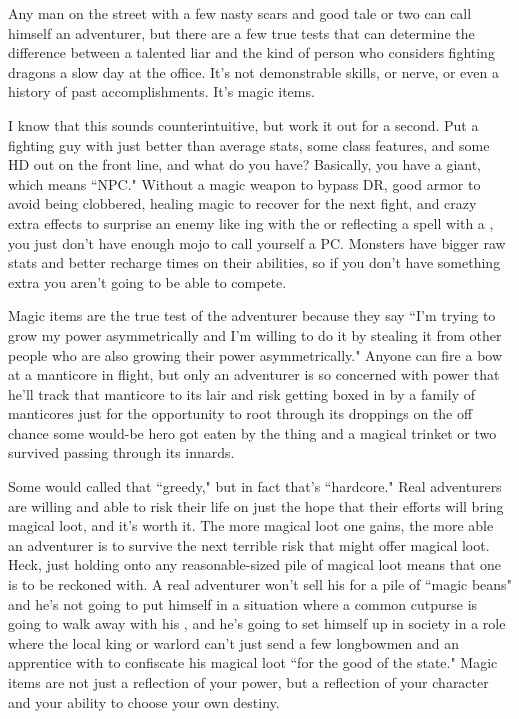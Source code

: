 Any man on the street with a few nasty scars and good tale or two can call himself an adventurer, but there are a few true tests that can determine the difference between a talented liar and the kind of person who considers fighting dragons a slow day at the office. It's not demonstrable skills, or nerve, or even a history of past accomplishments. It's magic items.

I know that this sounds counterintuitive, but work it out for a second. Put a fighting guy with just better than average stats, some class features, and some HD out on the front line, and what do you have? Basically, you have a giant, which means ``NPC." Without a magic weapon to bypass DR, good armor to avoid being clobbered, healing magic to recover for the next fight, and crazy extra effects to surprise an enemy like ing with the  or reflecting a spell with a , you just don't have enough mojo to call yourself a PC. Monsters have bigger raw stats and better recharge times on their abilities, so if you don't have something extra you aren't going to be able to compete.

Magic items are the true test of the adventurer because they say ``I'm trying to grow my power asymmetrically and I'm willing to do it by stealing it from other people who are also growing their power asymmetrically." Anyone can fire a bow at a manticore in flight, but only an adventurer is so concerned with power that he'll track that manticore to its lair and risk getting boxed in by a family of manticores just for the opportunity to root through its droppings on the off chance some would-be hero got eaten by the thing and a magical trinket or two survived passing through its innards.

Some would called that ``greedy," but in fact that's ``hardcore." Real adventurers are willing and able to risk their life on just the hope that their efforts will bring magical loot, and it's worth it. The more magical loot one gains, the more able an adventurer is to survive the next terrible risk that might offer magical loot. Heck, just holding onto any reasonable-sized pile of magical loot means that one is to be reckoned with. A real adventurer won't sell his  for a pile of ``magic beans" and he's not going to put himself in a situation where a common cutpurse is going to walk away with his , and he's going to set himself up in society in a role where the local king or warlord can't just send a few longbowmen and an apprentice with  to confiscate his magical loot ``for the good of the state." Magic items are not just a reflection of your power, but a reflection of your character and your ability to choose your own destiny.


